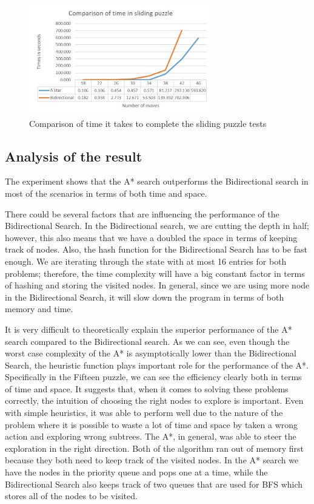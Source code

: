 \documentclass[conference]{IEEEtran}
\begin{document}
\begin{figure}[!t]
\includegraphics[width=8cm]{slidingTime}
\centering
\caption{Comparison of time it takes to complete the sliding puzzle tests}
\label{fig_sim}
\end{figure}

\subsection{Analysis of the result}

The experiment shows that the A* search outperforms the Bidirectional search in most of the scenarios in terms of both time and space.

There could be several factors that are influencing the performance of the Bidirectional Search. In the Bidirectional search, we are cutting the depth in half; however, this also means that we have a doubled the space in terms of keeping track of nodes. Also, the hash function for the Bidirectional Search has to be fast enough. We are iterating through the state with at most 16 entries for both problems; therefore, the time complexity will have a big constant factor in terms of hashing and storing the visited nodes. In general, since we are using more node in the Bidirectional Search, it will slow down the program in terms of both memory and time.

It is very difficult to theoretically explain the superior performance of the A* search compared to the Bidirectional search. As we can see, even though the worst case complexity of the A* is asymptotically lower than the Bidirectional Search, the heuristic function plays important role for the performance of the A*. Specifically in the Fifteen puzzle, we can see the efficiency clearly both in terms of time and space. It suggests that, when it comes to solving these problems correctly, the intuition of choosing the right nodes to explore is important. Even with simple heuristics, it was able to perform well due to the nature of the problem where it is possible to waste a lot of time and space by taken a wrong action and exploring wrong subtrees. The A*, in general, was able to steer the exploration in the right direction. 
Both of the algorithm ran out of memory first because they both need to keep track of the visited nodes. In the A* search we have the nodes in the priority queue and pops one at a time, while the Bidirectional Search also keeps track of two queues that are used for BFS which stores all of the nodes to be visited.
\end{document}

